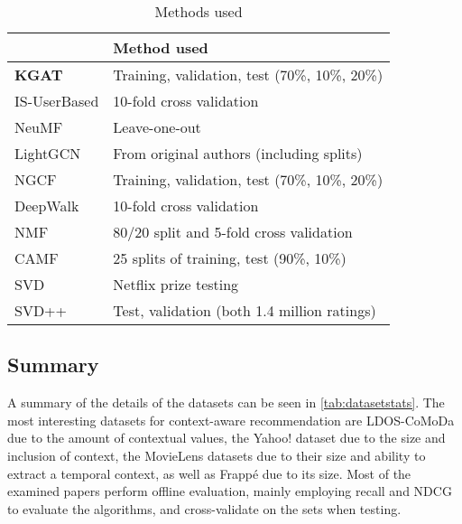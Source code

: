 \begin{table*}[]
    \begin{tabular}{|l|l|}
    \hline
    \textbf{}     & \textbf{Method used}                          \\ \hline
    \textbf{KGAT} & Training, validation, test (70\%, 10\%, 20\%) \\ \hline
    IS-UserBased  & 10-fold cross validation                      \\ \hline
    NeuMF         & Leave-one-out                                 \\ \hline
    LightGCN      & From original authors (including splits)      \\ \hline
    NGCF          & Training, validation, test (70\%, 10\%, 20\%) \\ \hline
    DeepWalk      & 10-fold cross validation                      \\ \hline
    NMF           & 80/20 split and 5-fold cross validation       \\ \hline
    CAMF          & 25 splits of training, test (90\%, 10\%)      \\ \hline
    SVD           & Netflix prize testing                         \\ \hline
    SVD++         & Test, validation (both 1.4 million ratings)   \\ \hline
    \end{tabular}
    \caption{Methods used}
    \label{tab:methodsused}
\end{table*}

\subsection{Summary}\label{sec:datasetsummary}
A summary of the details of the datasets can be seen in \autoref{tab:datasetstats}.
The most interesting datasets for context-aware recommendation are LDOS-CoMoDa due to the amount of contextual values, the Yahoo! dataset due to the size and inclusion of context, the MovieLens datasets due to their size and ability to extract a temporal context, as well as Frappé due to its size.
Most of the examined papers perform offline evaluation, mainly employing recall and NDCG to evaluate the algorithms, and cross-validate on the sets when testing.

